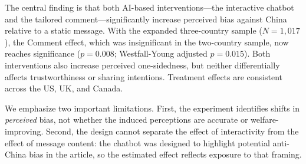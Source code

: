 \documentclass[12pt]{article}
\begin{document}
The central finding is that both AI-based interventions---the interactive chatbot and the tailored comment---significantly increase perceived bias against China relative to a static message. With the expanded three-country sample ($N=1{,}017$), the Comment effect, which was insignificant in the two-country sample, now reaches significance ($p=0.008$; Westfall-Young adjusted $p=0.015$). Both interventions also increase perceived one-sidedness, but neither differentially affects trustworthiness or sharing intentions. Treatment effects are consistent across the US, UK, and Canada.

We emphasize two important limitations. First, the experiment identifies shifts in \textit{perceived} bias, not whether the induced perceptions are accurate or welfare-improving. Second, the design cannot separate the effect of interactivity from the effect of message content: the chatbot was designed to highlight potential anti-China bias in the article, so the estimated effect reflects exposure to that framing.
\end{document}
